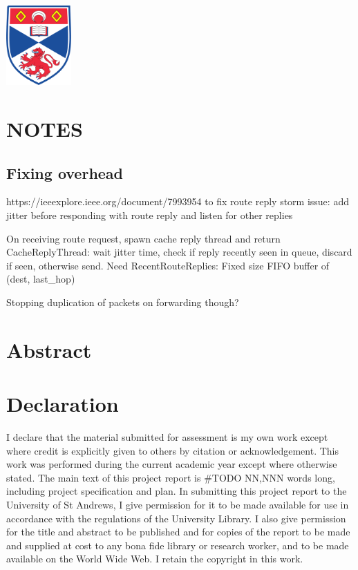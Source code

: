 \documentclass[12pt]{article}
\begin{document}
\begin{titlepage}
\includegraphics[width = 2.5cm]{images/standrewslogo.png}
 

\vfill %

\end{titlepage}


\section{NOTES}

\subsection{Fixing overhead}

https://ieeexplore.ieee.org/document/7993954 to fix route reply storm issue: add jitter before responding with route reply and listen for other replies

On receiving route request, spawn cache reply thread and return
CacheReplyThread: wait jitter time, check if reply recently seen in queue, discard if seen, otherwise send.
Need RecentRouteReplies: Fixed size FIFO buffer of (dest, last_hop)

Stopping duplication of packets on forwarding though?

\section*{Abstract}



\section*{Declaration}
I declare that the material submitted for
assessment is my own work except where credit is
explicitly given to others by citation or
acknowledgement. This work was performed during
the current academic year except where otherwise
stated.
The main text of this project report is \#TODO NN,NNN
words long, including project specification and plan.
In submitting this project report to the University of
St Andrews, I give permission for it to be made
available for use in accordance with the regulations of
the University Library. I also give permission for
the title and abstract to be published and for copies of
the report to be made and supplied at cost to any bona
fide library or research worker, and to be made
available on the World Wide Web. I retain the
copyright in this work.
\end{document}
